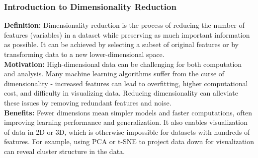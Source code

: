 \documentclass[aspectratio=169]{beamer}
\begin{document}
\begin{frame} 
      \frametitle{Introduction to Dimensionality Reduction}
      \textbf{Definition:} Dimensionality reduction is the process of reducing the number of features (variables) in a dataset while preserving as much important information as possible. It can be achieved by selecting a subset of original features or by transforming data to a new lower-dimensional space.\\
      \pause
      \smallskip
      \textbf{Motivation:} High-dimensional data can be challenging for both computation and analysis. Many machine learning algorithms suffer from the curse of dimensionality - increased features can lead to overfitting, higher computational cost, and difficulty in visualizing data. Reducing dimensionality can alleviate these issues by removing redundant features and noise.\\
      \pause 
      \smallskip
      \textbf{Benefits:} Fewer dimensions mean simpler models and faster computations, often improving learning performance and generalization. It also enables visualization of data in 2D or 3D, which is otherwise impossible for datasets with hundreds of features. For example, using PCA or t-SNE to project data down for visualization can reveal cluster structure in the data.
\end{frame}


\end{document}
